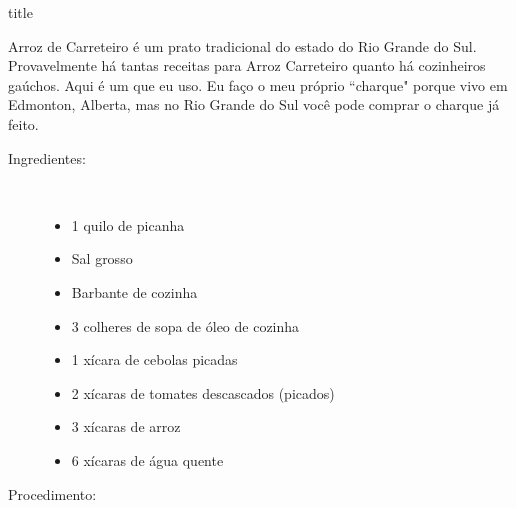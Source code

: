 \documentclass [11pt, letterpaper] {article}
\begin{document}
 {title}

Arroz de Carreteiro é um prato tradicional do estado do Rio Grande do Sul. Provavelmente há tantas receitas para Arroz Carreteiro quanto há cozinheiros gaúchos. Aqui é um que eu uso. Eu faço o meu próprio ``charque" porque vivo em Edmonton, Alberta, mas no Rio Grande do Sul você pode comprar o charque já feito.

\vspace {0.3in}

\begin {description}

\item [Ingredientes:] \ \\
\begin {itemize}
\item 1 quilo de picanha
\item Sal grosso
\item Barbante de cozinha
\item 3 colheres de sopa de óleo de cozinha
\item 1 xícara de cebolas picadas
\item 2 xícaras de tomates descascados (picados)
\item 3 xícaras de arroz
\item 6 xícaras de água quente
\end {itemize}

\item [Procedimento:] \ \\


\end{description}
\end{document}
